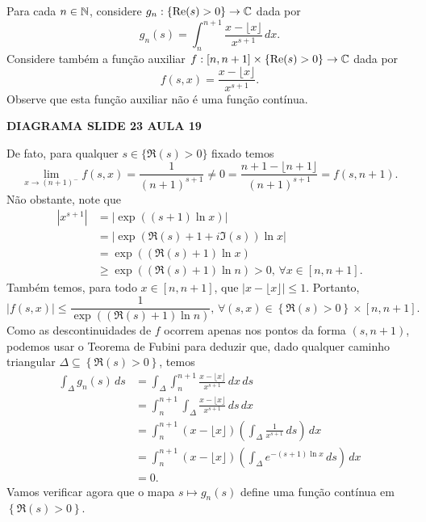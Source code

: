 \begin{exemplo}
Para cada $n\in\mathbb{N}$, considere $g_n:\{ \mathrm{Re}(s) > 0 \} \to \mathbb{C}$ dada por
%
\[
g_n(s) = \int_n^{n+1} \frac{x - \lfloor x \rfloor}{x^{s+1}} \, dx.
\]
%
Considere também a função auxiliar 
$f: [n, n+1]\times \{ \mathrm{Re}(s) > 0 \} \to \mathbb{C}$ 
dada por
%
\[
f(s,x) = \frac{x - \lfloor x \rfloor}{x^{s+1}}.
\]
%
Observe que esta função auxiliar não é uma função contínua.
%
\begin{center}
    {\bf DIAGRAMA SLIDE 23 AULA 19}
\end{center}
%
De fato, para qualquer $s\in \{ \Re(s) > 0 \}$ fixado temos
%
\[
\lim_{x\to (n+1)^-} f(s,x)
= \frac{1}{(n+1)^{s+1}}
\neq 0 
= \frac{n+1 - \lfloor n+1 \rfloor}{(n+1)^{s+1}}
= f(s,n+1).
\]
%
Não obstante, note que
%
\begin{align*}
    |x^{s+1}| &= \left|\exp((s+1)\ln x)\right| \\
              &= \left|\exp\left( \Re(s) + 1 + i\Im(s) \right) \ln x\right| \\
              &= \exp\left( (\Re(s) + 1)\ln x \right) \\
              &\geq \exp\left( (\Re(s) + 1)\ln n \right) > 0, \, \forall x\in [n,n+1].
\end{align*}
%
Também temos, para todo $x\in[n,n+1]$, que $|x - \lfloor x \rfloor| \leq 1$. Portanto,
%
\[
|f(s,x)| \leq \frac{1}{\exp\left( (\Re(s) + 1)\ln n \right)}, \, 
\forall (s,x) \in \left\{ \Re(s) > 0 \right\}\times[n,n+1].
\]
%
Como as descontinuidades de $f$ ocorrem apenas nos pontos da forma $(s,n+1)$, podemos
usar o Teorema de Fubini para deduzir que, dado qualquer caminho triangular
$\Delta \subseteq \left\{ \Re(s) > 0 \right\}$, temos
%
\begin{align*}
    \int_{\Delta} g_n(s) \, ds 
    &= \int_{\Delta} \int_n^{n+1} \frac{x - \lfloor x \rfloor}{x^{s+1}} \, dx \, ds 
    \\[0.3cm]
    &= \int_n^{n+1} \int_{\Delta} \frac{x - \lfloor x \rfloor}{x^{s+1}} \, ds \, dx 
    \\[0.3cm]
    &= \int_n^{n+1} (x - \lfloor x \rfloor) 
    \left(\int_{\Delta} \frac{1}{x^{s+1}} \, ds \right) \, dx
    \\[0.3cm]
    &= \int_n^{n+1} (x - \lfloor x \rfloor) 
    \left(\int_{\Delta} e^{-(s+1)\ln x} \, ds \right) \, dx 
    \\[0.3cm]
    &= 0.
\end{align*}
%
Vamos verificar agora que o mapa $s\longmapsto g_n(s)$ define uma função contínua em 
$\left\{ \Re(s) > 0 \right\}$. 


\end{exemplo}
